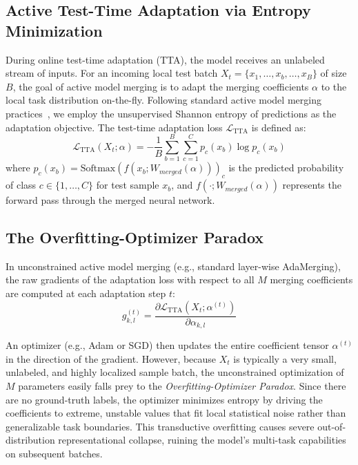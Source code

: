 \subsection{Active Test-Time Adaptation via Entropy Minimization}
During online test-time adaptation (TTA), the model receives an unlabeled stream of inputs. For an incoming local test batch $X_t = \{x_1, \dots, x_b, \dots, x_B\}$ of size $B$, the goal of active model merging is to adapt the merging coefficients $\alpha$ to the local task distribution on-the-fly. Following standard active model merging practices~\cite{adamerging}, we employ the unsupervised Shannon entropy of predictions as the adaptation objective. The test-time adaptation loss $\mathcal{L}_{\text{TTA}}$ is defined as:
\begin{equation}
    \mathcal{L}_{\text{TTA}}(X_t; \alpha) = -\frac{1}{B} \sum_{b=1}^B \sum_{c=1}^C p_c(x_b) \log p_c(x_b)
    \label{eq:entropy}
\end{equation}
where $p_c(x_b) = \text{Softmax}(f(x_b; W_{merged}(\alpha)))_c$ is the predicted probability of class $c \in \{1, \dots, C\}$ for test sample $x_b$, and $f(\cdot; W_{merged}(\alpha))$ represents the forward pass through the merged neural network.

\subsection{The Overfitting-Optimizer Paradox}
In unconstrained active model merging (e.g., standard layer-wise AdaMerging), the raw gradients of the adaptation loss with respect to all $M$ merging coefficients are computed at each adaptation step $t$:
\begin{equation}
    g_{k, l}^{(t)} = \frac{\partial \mathcal{L}_{\text{TTA}}(X_t; \alpha^{(t)})}{\partial \alpha_{k, l}}
\end{equation}

An optimizer (e.g., Adam or SGD) then updates the entire coefficient tensor $\alpha^{(t)}$ in the direction of the gradient. However, because $X_t$ is typically a very small, unlabeled, and highly localized sample batch, the unconstrained optimization of $M$ parameters easily falls prey to the \emph{Overfitting-Optimizer Paradox}. Since there are no ground-truth labels, the optimizer minimizes entropy by driving the coefficients to extreme, unstable values that fit local statistical noise rather than generalizable task boundaries. This transductive overfitting causes severe out-of-distribution representational collapse, ruining the model's multi-task capabilities on subsequent batches.

